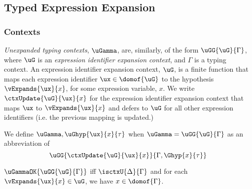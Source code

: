 \subsection{Typed Expression Expansion}\label{appendix:typed-expression-expansion-S}
\subsubsection{Contexts}
\emph{Unexpanded typing contexts}, $\uGamma$, are, similarly, of the form $\uGG{\uG}{\Gamma}$, where $\uG$ is an \emph{expression identifier expansion context}, and $\Gamma$ is a typing context. An expression identifier expansion context, $\uG$, is a finite function that maps each expression identifier $\ux \in \domof{\uG}$ to the hypothesis $\vExpands{\ux}{x}$, for some expression variable, $x$. We write $\ctxUpdate{\uG}{\ux}{x}$ for the expression identifier expansion context that maps $\ux$ to $\vExpands{\ux}{x}$ and defers to $\uG$ for all other expression identifiers (i.e. the previous mapping is updated.) 

We define $\uGamma, \uGhyp{\ux}{x}{\tau}$ when $\uGamma = \uGG{\uG}{\Gamma}$ as an abbreviation of \[\uGG{\ctxUpdate{\uG}{\ux}{x}}{\Gamma, \Ghyp{x}{\tau}}\]

\begin{definition} $\uGammaOK{\uGG{\uG}{\Gamma}}$ iff $\isctxU{\Delta}{\Gamma}$ and for each $\vExpands{\ux}{x} \in \uG$, we have $x \in \domof{\Gamma}$.\end{definition}


